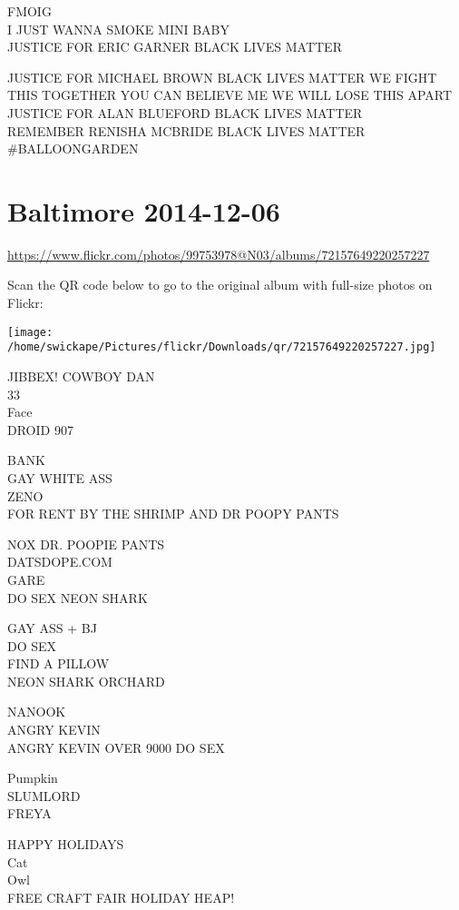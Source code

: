 \documentclass[10pt,letterpaper]{article}
\begin{document}
FMOIG\\
I JUST WANNA SMOKE MINI BABY\\
JUSTICE FOR ERIC GARNER BLACK LIVES MATTER

JUSTICE FOR MICHAEL BROWN BLACK LIVES MATTER WE FIGHT THIS TOGETHER YOU CAN BELIEVE ME WE WILL LOSE THIS APART\\
JUSTICE FOR ALAN BLUEFORD BLACK LIVES MATTER\\
REMEMBER RENISHA MCBRIDE BLACK LIVES MATTER\\
\#BALLOONGARDEN


\section*{Baltimore 2014-12-06}

\url{https://www.flickr.com/photos/99753978@N03/albums/72157649220257227}

Scan the QR code below to go to the original album with full-size photos on Flickr:

\texttt{[image: /home/swickape/Pictures/flickr/Downloads/qr/72157649220257227.jpg]}


JIBBEX! COWBOY DAN\\
33\\
Face\\
DROID 907

BANK\\
GAY WHITE ASS\\
ZENO\\
FOR RENT BY THE SHRIMP AND DR POOPY PANTS

NOX DR. POOPIE PANTS\\
DATSDOPE.COM\\
GARE\\
DO SEX NEON SHARK

GAY ASS + BJ\\
DO SEX\\
FIND A PILLOW\\
NEON SHARK ORCHARD

NANOOK\\
ANGRY KEVIN\\
ANGRY KEVIN OVER 9000 DO SEX

Pumpkin\\
SLUMLORD\\
FREYA

HAPPY HOLIDAYS\\
Cat\\
Owl\\
FREE CRAFT FAIR HOLIDAY HEAP!
\end{document}
